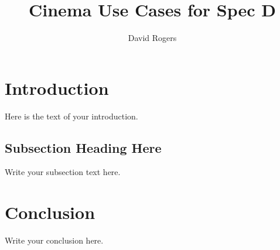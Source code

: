 \documentclass{article}
\begin{document}
\title{Cinema Use Cases for Spec D}
\author{David Rogers}

\maketitle

\section{Introduction}
Here is the text of your introduction.


\subsection{Subsection Heading Here}
Write your subsection text here.


\section{Conclusion}
Write your conclusion here.
\end{document}
